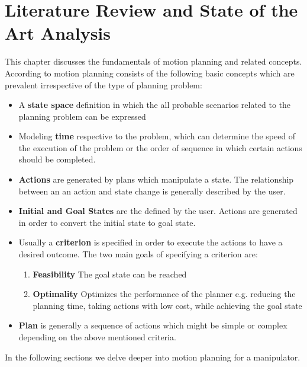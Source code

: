  \section{Literature Review and State of the Art Analysis}

This chapter discusses the fundamentals of motion planning and related concepts. According to \citet{Lav06}motion planning consists of the following basic concepts which are prevalent irrespective of the type of planning problem:
\begin{itemize}
\item A \textbf{state space} definition in which the all probable scenarios related to the planning problem can be expressed
\item Modeling \textbf{time} respective to the problem, which can determine the speed of the execution of the problem or the order of sequence in which certain actions should be completed.
\item \textbf{Actions} are generated by plans which manipulate a state. The relationship between an an action and state change is generally described by the user. 
\item \textbf{Initial and Goal States} are the defined by the user. Actions are generated in order to convert the initial state to goal state.
\item Usually a \textbf{criterion} is specified in order to execute the actions to have a desired outcome. The two main goals of specifying a criterion are:
\begin{enumerate}
\item \textbf{Feasibility} The goal state can be reached 
\item \textbf{Optimality} Optimizes the performance of the planner e.g. reducing the planning time, taking actions with low cost, while achieving the goal state 
\end{enumerate}
\item \textbf{Plan} is generally a sequence of actions which might be simple or complex depending on the above mentioned criteria. 
\end{itemize}
In the following sections we delve deeper into motion planning for a manipulator.


